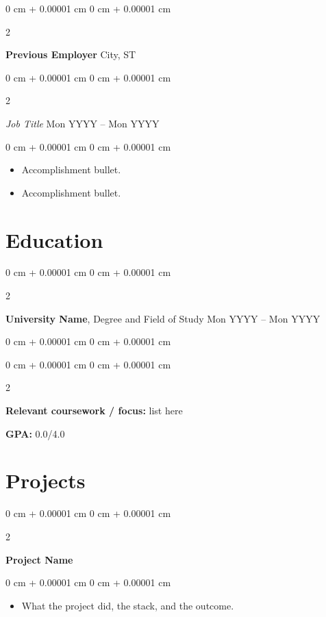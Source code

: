 \documentclass[10pt, letterpaper]{article}
\newenvironment{highlights}{
    \begin{itemize}[
        topsep=0.10 cm,
        parsep=0.10 cm,
        partopsep=0pt,
        itemsep=0pt,
        leftmargin=0 cm + 10pt
    ]
}{
    \end{itemize}
} %
\newenvironment{onecolentry}{
    \begin{adjustwidth}{
        0 cm + 0.00001 cm
    }{
        0 cm + 0.00001 cm
    }
}{
    \end{adjustwidth}
} %
\newenvironment{twocolentry}[2][]{
    \onecolentry
    \def\secondColumn{#2}
    \setcolumnwidth{\fill, 4.5 cm}
    \begin{paracol}{2}
}{
    \switchcolumn \raggedleft \secondColumn
    \end{paracol}
    \endonecolentry
} %
\begin{document}
        \begin{twocolentry}{
            City, ST
        }
            \textbf{Previous Employer}\end{twocolentry}
        \vspace{0.05 cm}
        \begin{twocolentry}{
            Mon YYYY -- Mon YYYY
        }
            \textit{Job Title}\end{twocolentry}
        \vspace{0.05 cm}
        \begin{onecolentry}
            \begin{highlights}
                \item Accomplishment bullet.
                \item Accomplishment bullet.
            \end{highlights}
        \end{onecolentry}

    \section{Education}
        \begin{twocolentry}{
            Mon YYYY -- Mon YYYY
        }
            \textbf{University Name}, Degree and Field of Study\end{twocolentry}
        \begin{onecolentry}
            \begin{highlights}
                \begin{twocolentry}{
                    \textbf{GPA:} 0.0/4.0
                }
                    \textbf{Relevant coursework / focus:} list here
                \end{twocolentry}
            \end{highlights}
        \end{onecolentry}

    \section{Projects}
        \begin{twocolentry}{
        }
            \textbf{Project Name}\end{twocolentry}
        \vspace{0.10 cm}
        \begin{onecolentry}
            \begin{highlights}
                \item What the project did, the stack, and the outcome.
            \end{highlights}
        \end{onecolentry}
\end{document}

